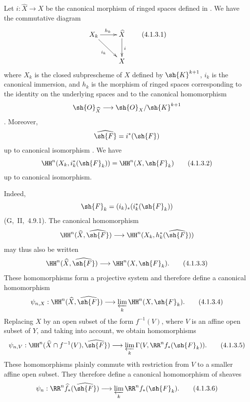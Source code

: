 \begin{env}[4.1.3]
\label{III.4.1.3}
Let $i:\widehat{X}\to X$ be the canonical morphism of ringed spaces
defined in .
We have the commutative diagram
\[
  \xymatrix{
    X_k\ar[r]^{h_k}\ar[dr]_{i_k} &
    \widehat{X}\ar[d]^{i}\\
    & X
  }
  \tag{4.1.3.1}
  \label{III.4.1.3.1}
\]
where $X_k$ is the closed subprescheme of $X$ defined by
$\sh{K}^{k+1}$, $i_k$ is the canonical immersion, and $h_k$ is the
morphism of ringed spaces corresponding to the identity on the
underlying spaces and to the canonical homomorphism
\[
  \sh{O}_{\widehat{X}}
  \longrightarrow
  \sh{O}_X/\sh{K}^{k+1}
\]
.
Moreover,
\[
  \widehat{\sh{F}}=i^*(\sh{F})
\]
up to canonical isomorphism .
We have
\[
  \HH^n(X_k,i_k^*(\sh{F}_k))
  =
  \HH^n(X,\sh{F}_k)
  \tag{4.1.3.2}
  \label{III.4.1.3.2}
\]
up to canonical isomorphism.


Indeed,
\[
  \sh{F}_k=(i_k)_*(i_k^*(\sh{F}_k))
\]
(G,~II,~4.9.1).
The canonical homomorphism
\[
  \HH^n(\widehat{X},\widehat{\sh{F}})
  \longrightarrow
  \HH^n(X_k,h_k^*(\widehat{\sh{F}}))
\]
 may thus also be written
\[
  \HH^n(\widehat{X},\widehat{\sh{F}})
  \longrightarrow
  \HH^n(X,\sh{F}_k).
  \tag{4.1.3.3}
  \label{III.4.1.3.3}
\]
These homomorphisms form a projective system and therefore define a
canonical homomorphism
\[
  \psi_{n,X}:
  \HH^n(\widehat{X},\widehat{\sh{F}})
  \longrightarrow
  \varprojlim_k\HH^n(X,\sh{F}_k).
  \tag{4.1.3.4}
  \label{III.4.1.3.4}
\]
Replacing $X$ by an open subset of the form $f^{-1}(V)$, where $V$ is
an affine open subset of $Y$, and taking  into account,
we obtain homomorphisms
\[
  \psi_{n,V}:
  \HH^n(\widehat{X}\cap f^{-1}(V),\widehat{\sh{F}})
  \longrightarrow
  \varprojlim_k\Gamma(V,\RR^n f_*(\sh{F}_k)).
  \tag{4.1.3.5}
  \label{III.4.1.3.5}
\]
These homomorphisms plainly commute with restriction from $V$ to a
smaller affine open subset.
They therefore define a canonical homomorphism of sheaves
\[
  \psi_n:
  \RR^n\widehat{f}_*(\widehat{\sh{F}})
  \longrightarrow
  \varprojlim_k\RR^n f_*(\sh{F}_k).
  \tag{4.1.3.6}
  \label{III.4.1.3.6}
\]
\end{env}

